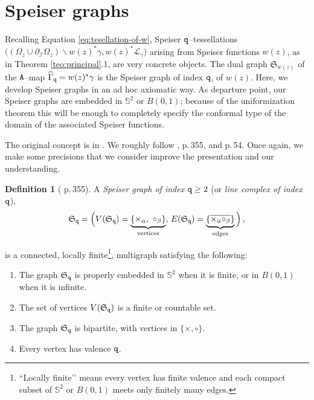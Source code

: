 \documentclass[final,3p,times]{elsarticle}
\newcommand{\esf}{\ensuremath{{\mathbb S}^2}}
\theoremstyle{definition}
\newtheorem{definition}[theorem]{Definition}
\begin{document}
\section{Speiser graphs}
\label{sec:Speiser-graphs} 
Recalling Equation \eqref{eq:tesellation-of-w}, Speiser $\tt q$--tessellations
$\big( (\Omega_z \cup \partial_{\mathcal{I}}\Omega_z ) \backslash w(z)^* \gamma, 
w(z)^*\mathcal{L}_\gamma \big)$
 arising from Speiser functions $w(z)$, 
as in Theorem \ref{teo:principal}.1, 
are very concrete objects.
The dual graph $\mathfrak{S}_{w(z)}$ of the 
$\tt A$--map $\widehat{\Gamma}_{\tt q} = w(z)^*\gamma$ 
is the Speiser graph of index $\tt q$, of $w(z)$.
Here,
we develop Speiser graphs in an ad hoc axiomatic way.
As departure point, our Speiser graphs are embedded in 
$\esf$  or $B(0,1)$; because of the uniformization 
theorem this will be enough to completely specify
the conformal type of the domain of the associated Speiser 
functions.

The original concept is in  \cite{Speiser}.
We roughly follow 
\cite{Nevanlinna2},
\cite{GoldbergOstrovskii} p.\,355, and \cite{Masoero} p.\,54.
Once again, we make some precisions that we consider improve
the presentation and our understanding.


\begin{definition}[\cite{GoldbergOstrovskii} p.\,355]
\label{def:Speiser-graph}
A \emph{Speiser graph of index ${\tt q} \geq 2$} 
(or \emph{line complex of index $\tt q$}), 
$$
\mathfrak{S}_{\tt q} =\Big( V(\mathfrak{S}_{\tt q})= 
\underbrace{ \{\times_\alpha, \ \circ_\beta \} }_{\text{vertices}}, 
\,
E(\mathfrak{S}_{\tt q}) = 
\underbrace{\{ \overline{\times_\alpha \circ_\beta} \}
}_{\text{edges}}    \Big) \, ,
$$

\noindent
is a connected, locally finite\footnote{
“Locally finite’’ means every vertex has finite valence 
and each compact subset of $\esf$ or $B(0,1)$ meets only finitely 
many edges.}, multigraph satisfying the following:

\begin{enumerate}[label=\roman*),leftmargin=*]
\item
The graph
$\mathfrak{S}_{\tt q}$ is
properly embedded in $\esf$ when it is finite, 
or in $B(0,1)$ when it is infinite.

\item 
The set of vertices $V(\mathfrak{S}_{\tt q})$ is a finite or countable set.

\item 
The graph $\mathfrak{S}_{\tt q}$ is bipartite, with vertices in $\{\times, \circ\}$.

\item
Every vertex has valence $\tt q$.
\end{enumerate}
\end{definition} 
\end{document}
